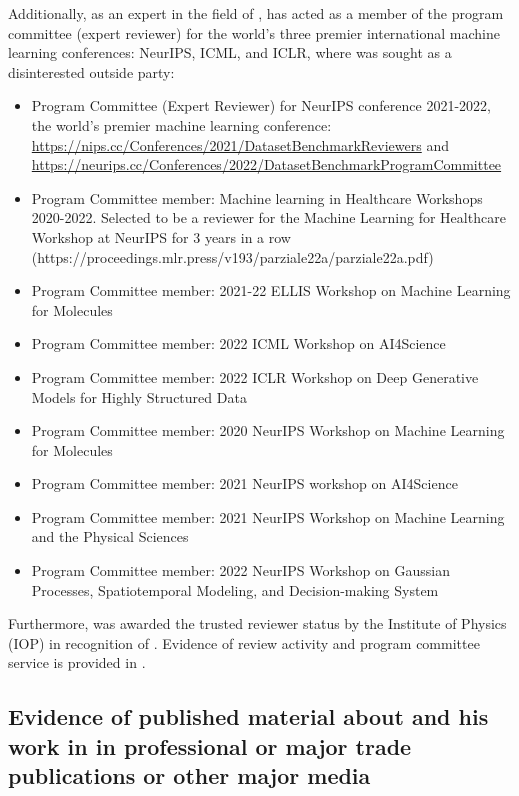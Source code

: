 \documentclass[11pt]{article}
\begin{document}
Additionally, as an expert in the field of \fie{}, \dr has acted as a member of the program committee (expert reviewer) for the world’s three premier international machine learning conferences: NeurIPS, ICML, and ICLR, where \dr was sought as a disinterested outside party:

\begin{itemize}
    \item Program Committee (Expert Reviewer) for NeurIPS conference 2021-2022, the world’s premier machine learning conference: \url{https://nips.cc/Conferences/2021/DatasetBenchmarkReviewers} and \url{https://neurips.cc/Conferences/2022/DatasetBenchmarkProgramCommittee}
    \item Program Committee member: Machine learning in Healthcare Workshops 2020-2022. Selected to be a reviewer for the Machine Learning for Healthcare Workshop at NeurIPS for 3 years in a row (https://proceedings.mlr.press/v193/parziale22a/parziale22a.pdf)
    \item Program Committee member: 2021-22 ELLIS Workshop on Machine Learning for Molecules
    \item Program Committee member: 2022 ICML Workshop on AI4Science
    \item Program Committee member: 2022 ICLR Workshop on Deep Generative Models for Highly Structured Data
    \item Program Committee member: 2020 NeurIPS Workshop on Machine Learning for Molecules
    \item Program Committee member: 2021 NeurIPS workshop on AI4Science
    \item Program Committee member: 2021 NeurIPS Workshop on Machine Learning and the Physical Sciences
    \item Program Committee member: 2022 NeurIPS Workshop on Gaussian Processes, Spatiotemporal Modeling, and Decision-making System
\end{itemize}

Furthermore, \dr was awarded the trusted reviewer status by the Institute of Physics (IOP) in recognition of  \cite{trusted_reviewer}. Evidence of \drs review activity and program committee service is provided in \cite{reviews}.


\subsection{Evidence of published material about \dr and his work in \fie{} in professional or major trade publications or other major media}
\label{media}
\end{document}
